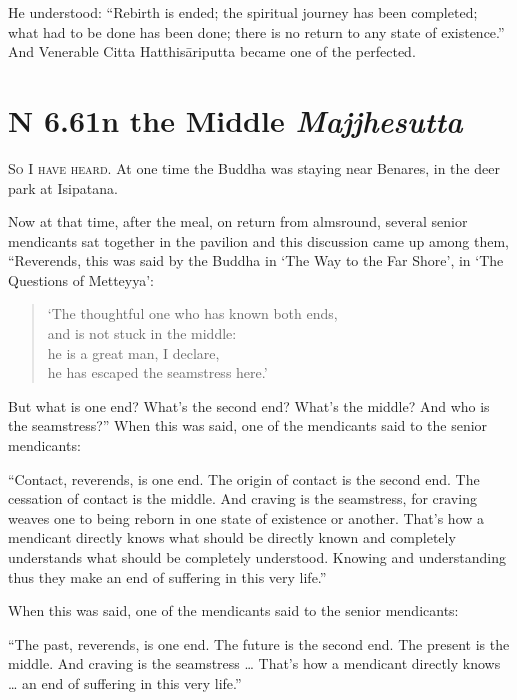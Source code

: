 \documentclass[12pt,openany]{book}%
\newcommand*{\suttatitleacronym}[1]{\smaller[2]{#1}\vspace*{.3em}}
\newcommand*{\suttatitletranslation}[1]{\linebreak{#1}}
\newcommand*{\suttatitleroot}[1]{\linebreak\smaller[2]\itshape{#1}}
\newcommand*{\tocacronym}[1]{\hspace*{-3.3em}{#1}\quad}
\newcommand*{\toctranslation}[1]{#1}
\newcommand*{\tocroot}[1]{(\textit{#1})}
\newcommand*{\scevam}[1]{\textsc{#1}}
\begin{document}
He understood: “Rebirth is ended; the spiritual journey has been completed; what had to be done has been done; there is no return to any state of existence.” And Venerable Citta \textsanskrit{Hatthisāriputta} became one of the perfected. 

%
\section*{{\suttatitleacronym AN 6.61}{\suttatitletranslation In the Middle }{\suttatitleroot Majjhesutta}}
\addcontentsline{toc}{section}{\tocacronym{AN 6.61} \toctranslation{In the Middle } \tocroot{Majjhesutta}}

\scevam{So I have heard. }At one time the Buddha was staying near Benares, in the deer park at Isipatana. 

Now at that time, after the meal, on return from almsround, several senior mendicants sat together in the pavilion and this discussion came up among them, “Reverends, this was said by the Buddha in ‘The Way to the Far Shore’, in ‘The Questions of Metteyya’: 

\begin{verse}%
‘The thoughtful one who has known both ends, \\
and is not stuck in the middle: \\
he is a great man, I declare, \\
he has escaped the seamstress here.’ 

%
\end{verse}

But what is one end? What’s the second end? What’s the middle? And who is the seamstress?” When this was said, one of the mendicants said to the senior mendicants: 

“Contact, reverends, is one end. The origin of contact is the second end. The cessation of contact is the middle. And craving is the seamstress, for craving weaves one to being reborn in one state of existence or another. That’s how a mendicant directly knows what should be directly known and completely understands what should be completely understood. Knowing and understanding thus they make an end of suffering in this very life.” 

When this was said, one of the mendicants said to the senior mendicants: 

“The past, reverends, is one end. The future is the second end. The present is the middle. And craving is the seamstress … That’s how a mendicant directly knows … an end of suffering in this very life.” 
\end{document}
